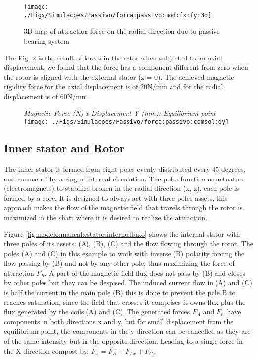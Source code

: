 \documentclass[journal,a4paper,oneside,twocolumn]{IEEEtran}
\begin{document}
\begin{figure}[th]
\centering
\texttt{[image: ./Figs/Simulacoes/Passivo/forca:passivo:mod:fx:fy:3d]}
\caption{3D map of attraction force on the radial direction due to passive bearing system}
\label{fig:forca:passivo:mod:fx:fy:3d}
\end{figure}

The Fig. \ref{fig:forca:passivo:comsol:dy} is the result of forces in the rotor when subjected to an axial displacement, we found that the force has a component different from zero when the rotor is aligned with the external stator (z = 0). The achieved magnetic rigidity force for the axial displacement is of 20N/mm and for the radial displacement is of 60N/mm. 

\begin{figure}[th]
\centering
{\footnotesize \textit{Magnetic Force (N) x Displacement Y (mm): Equilibrium point}}
\texttt{[image: ./Figs/Simulacoes/Passivo/forca:passivo:comsol:dy]}
\caption{}
\label{fig:forca:passivo:comsol:dy}
\end{figure}

\subsection{Inner stator and Rotor}

The inner stator is formed from eight poles evenly distributed every 45 degrees, and connected by a ring of internal circulation. The poles function as actuators (electromagnets) to stabilize broken in the radial direction (x, z), each pole is formed by a core.  It is designed to always act with three poles assets, this approach makes the flow of the magnetic field that travels through the rotor is maximized in the shaft where it is desired to realize the attraction.

Figure \ref{fig:modelo:mancal:estator:interno:fluxo} shows the internal stator with three poles of its assets: (A), (B), (C) and the flow flowing through the rotor. The poles (A) and (C) in this example to work with inverse (B) polarity forcing the flow passing by (B) and not by any other pole, thus maximizing the force of attraction $F_B$. A part of the magnetic field flux does not pass by (B) and closes by other poles but they can be despised. The induced current flow in (A) and (C) is half the current in the main pole (B) this is done to prevent the pole B to reaches saturation, since the field that crosses it comprises it owns flux plus the flux generated by the coils (A) and (C). The generated forces $F_A$ and $F_C$  have components in both directions x and y, but for small displacement from the equilibrium point, the components in the y direction can be cancelled as they are of the same intensity but in the opposite direction. Leading to a single force in the X direction compost by: $F_x = F_B + F_{Ax} + F_{Cx}$
\end{document}
